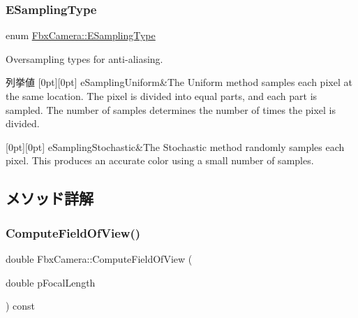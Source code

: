 \subsubsection{\texorpdfstring{E\+Sampling\+Type}{ESamplingType}}
{\footnotesize\ttfamily enum \hyperlink{class_fbx_camera_aed549486ed0985230efca6fae0d731ae}{Fbx\+Camera\+::\+E\+Sampling\+Type}}

Oversampling types for anti-\/aliasing. \begin{DoxyEnumFields}{列挙値}
[0pt][0pt]{}\mbox{\label{class_fbx_camera_aed549486ed0985230efca6fae0d731aea95d0fb02408eda0ecf4d8da0725134a8}} 
e\+Sampling\+Uniform&The Uniform method samples each pixel at the same location. The pixel is divided into equal parts, and each part is sampled. The number of samples determines the number of times the pixel is divided. \\
\hline

[0pt][0pt]{}\mbox{\label{class_fbx_camera_aed549486ed0985230efca6fae0d731aea799fd52a0de2b544194395fa6b8f198a}} 
e\+Sampling\+Stochastic&The Stochastic method randomly samples each pixel. This produces an accurate color using a small number of samples. \\
\hline

\end{DoxyEnumFields}


\subsection{メソッド詳解}
\mbox{\label{class_fbx_camera_ac4549addd7a3f9dc62843b9208a52d81}} 
\subsubsection{\texorpdfstring{Compute\+Field\+Of\+View()}{ComputeFieldOfView()}}
{\footnotesize\ttfamily double Fbx\+Camera\+::\+Compute\+Field\+Of\+View (\begin{DoxyParamCaption}\item[{double}]{p\+Focal\+Length }\end{DoxyParamCaption}) const}

